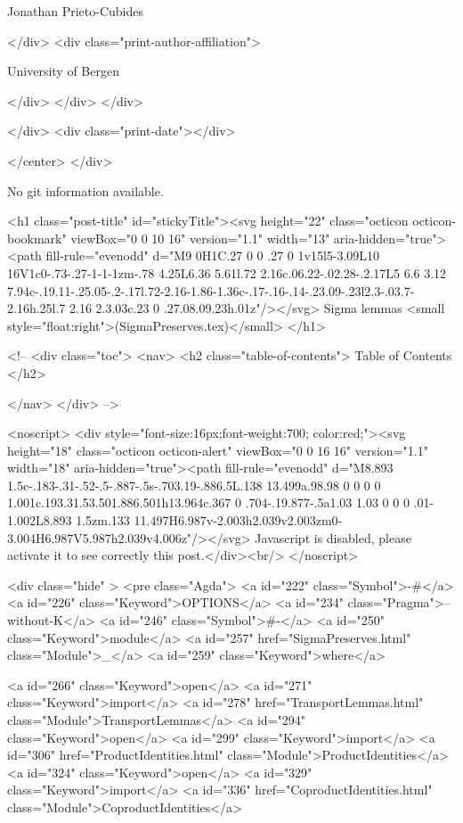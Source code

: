                   Jonathan Prieto-Cubides
                
              </div>
              <div class="print-author-affiliation">
                
                  University of Bergen
                
                </div>
            </div>
          </div>
          
          
        </div>
        <div class="print-date"></div>
        
        
    </center>
  </div>

  
  No git information available.
  

  <h1 class="post-title" id="stickyTitle"><svg height="22" class="octicon octicon-bookmark" viewBox="0 0 10 16" version="1.1" width="13" aria-hidden="true"><path fill-rule="evenodd" d="M9 0H1C.27 0 0 .27 0 1v15l5-3.09L10 16V1c0-.73-.27-1-1-1zm-.78 4.25L6.36 5.61l.72 2.16c.06.22-.02.28-.2.17L5 6.6 3.12 7.94c-.19.11-.25.05-.2-.17l.72-2.16-1.86-1.36c-.17-.16-.14-.23.09-.23l2.3-.03.7-2.16h.25l.7 2.16 2.3.03c.23 0 .27.08.09.23h.01z"/></svg> Sigma lemmas <small style="float:right">(SigmaPreserves.tex)</small>
  </h1>

  <!-- 
  <div class="toc">
    <nav>
    <h2 class="table-of-contents"> Table of Contents </h2>
      

    </nav>
  </div>
   -->

  <noscript>
  <div style="font-size:16px;font-weight:700; color:red;"><svg height="18" class="octicon octicon-alert" viewBox="0 0 16 16" version="1.1" width="18" aria-hidden="true"><path fill-rule="evenodd" d="M8.893 1.5c-.183-.31-.52-.5-.887-.5s-.703.19-.886.5L.138 13.499a.98.98 0 0 0 0 1.001c.193.31.53.501.886.501h13.964c.367 0 .704-.19.877-.5a1.03 1.03 0 0 0 .01-1.002L8.893 1.5zm.133 11.497H6.987v-2.003h2.039v2.003zm0-3.004H6.987V5.987h2.039v4.006z"/></svg> Javascript is disabled, please activate it to see correctly this post.</div><br/>
  </noscript>

  <div class="hide" >
<pre class="Agda">
<a id="222" class="Symbol">{-#</a> <a id="226" class="Keyword">OPTIONS</a> <a id="234" class="Pragma">--without-K</a> <a id="246" class="Symbol">#-}</a>
<a id="250" class="Keyword">module</a> <a id="257" href="SigmaPreserves.html" class="Module">_</a> <a id="259" class="Keyword">where</a>

<a id="266" class="Keyword">open</a> <a id="271" class="Keyword">import</a> <a id="278" href="TransportLemmas.html" class="Module">TransportLemmas</a>
<a id="294" class="Keyword">open</a> <a id="299" class="Keyword">import</a> <a id="306" href="ProductIdentities.html" class="Module">ProductIdentities</a>
<a id="324" class="Keyword">open</a> <a id="329" class="Keyword">import</a> <a id="336" href="CoproductIdentities.html" class="Module">CoproductIdentities</a>

